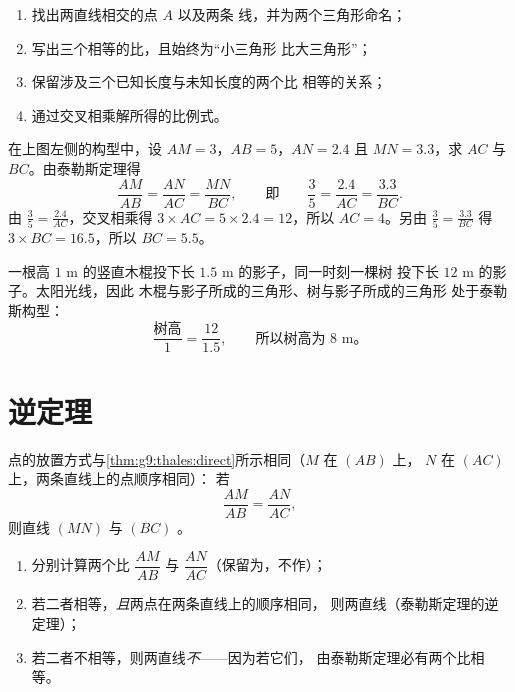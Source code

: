 \begin{method}[用泰勒斯定理计算长度]\label{met:g9:thales:compute}
\begin{enumerate}
  \item 找出两直线相交的点 $A$ 以及两条
        线，并为两个三角形命名；
  \item 写出三个相等的比，且始终为“小三角形
        比大三角形”；
  \item 保留涉及三个已知长度与未知长度的两个比
        相等的关系；
  \item 通过交叉相乘解所得的比例式。
\end{enumerate}
\end{method}

\begin{example}\label{ex:g9:thales:compute}
在上图左侧的构型中，设 $AM = 3$，$AB = 5$，$AN = 2.4$
且 $MN = 3.3$，求 $AC$ 与 $BC$。由泰勒斯定理得
\[
\frac{AM}{AB} = \frac{AN}{AC} = \frac{MN}{BC},
\qquad\text{即}\qquad
\frac35 = \frac{2.4}{AC} = \frac{3.3}{BC}.
\]
由 $\frac35 = \frac{2.4}{AC}$，交叉相乘得
$3 \times AC = 5 \times 2.4 = 12$，所以 $AC = 4$。另由
$\frac35 = \frac{3.3}{BC}$ 得 $3 \times BC = 16.5$，所以 $BC = 5.5$。
\end{example}

\begin{example}[生活中的泰勒斯定理]\label{ex:g9:thales:stick}
一根高 $1$ m 的竖直木棍投下长 $1.5$ m 的影子，同一时刻一棵树
投下长 $12$ m 的影子。太阳光线，因此
木棍与影子所成的三角形、树与影子所成的三角形
处于泰勒斯构型：
\[
\frac{\text{树高}}{1} = \frac{12}{1.5},
\qquad\text{所以树高为 } 8 \text{ m。}
\]
\end{example}

\section{逆定理}

\begin{theorem}[泰勒斯定理的逆定理]\label{thm:g9:thales:converse}
点的放置方式与\cref{thm:g9:thales:direct}所示相同（$M$ 在 $(AB)$ 上，
$N$ 在 $(AC)$ 上，两条直线上的点顺序相同）：
若
\[
\frac{AM}{AB} = \frac{AN}{AC},
\]
则直线 $(MN)$ 与 $(BC)$ 。
\end{theorem}
\admitted

\begin{method}[证明或否定平行关系]\label{met:g9:thales:converse}
\begin{enumerate}
  \item 分别计算两个比 $\dfrac{AM}{AB}$ 与
        $\dfrac{AN}{AC}$（保留为，不作）；
  \item 若二者相等，\emph{且}两点在两条直线上的顺序相同，
        则两直线（泰勒斯定理的逆定理）；
  \item 若二者不相等，则两直线\emph{不}——因为若它们，
        由泰勒斯定理必有两个比相等。
\end{enumerate}
\end{method}

